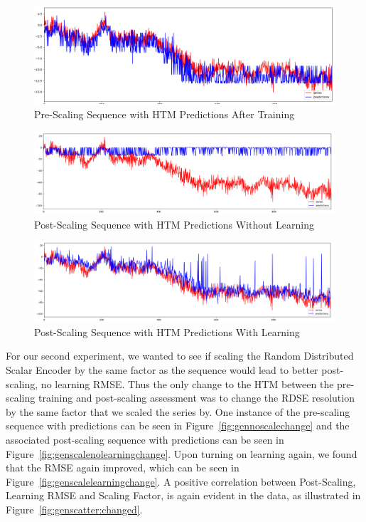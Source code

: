 \documentclass[oneside,12pt,openany]{book}
\begin{document}
        \begin{figure}[hbt!]
            \centering
            \includegraphics[width=\linewidth]{images/NoScaling-Unchanged.png}
            \caption{Pre-Scaling Sequence with HTM Predictions After Training}
            \label{fig:gennoscaleunchanged}
        \end{figure}
        \begin{figure}[hbt!]
            \centering
            \includegraphics[width=\linewidth]{images/Scaling-NoLearning-Unchanged.png}
            \caption{Post-Scaling Sequence with HTM Predictions Without Learning}
            \label{fig:genscalenolearningunchanged}
        \end{figure}
        \begin{figure}[hbt!]
            \centering
            \includegraphics[width=\linewidth]{images/Scaling-Learning-Unchanged.png}
            \caption{Post-Scaling Sequence with HTM Predictions With Learning}
            \label{fig:genscalelearningunchanged}
        \end{figure}
    \FloatBarrier
    
    
    For our second experiment, we wanted to see if scaling the Random Distributed Scalar Encoder by the same factor as the sequence would lead to better post-scaling, no learning RMSE. Thus the only change to the HTM between the pre-scaling training and post-scaling assessment was to change the RDSE resolution by the same factor that we scaled the series by. One instance of the pre-scaling sequence with predictions can be seen in Figure~\ref{fig:gennoscalechange} and the associated post-scaling sequence with predictions can be seen in Figure~\ref{fig:genscalenolearningchange}. Upon turning on learning again, we found that the RMSE again improved, which can be seen in Figure~\ref{fig:genscalelearningchange}. A positive correlation between Post-Scaling, Learning RMSE and Scaling Factor, is again evident in the data, as illustrated in Figure~\ref{fig:genscatter:changed}.
    
\end{document}
